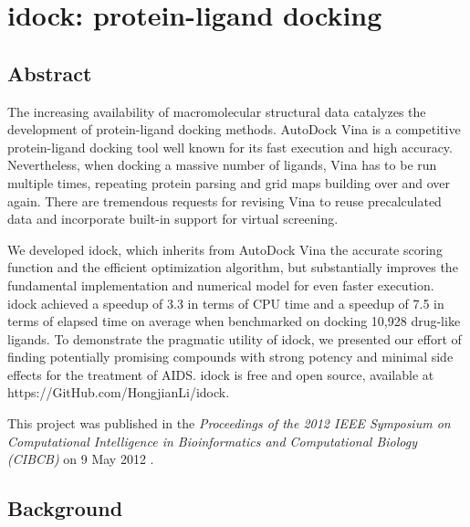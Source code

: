 \chapter{idock: protein-ligand docking}
\label{idock}

\section{Abstract}

The increasing availability of macromolecular structural data catalyzes the development of protein-ligand docking methods. AutoDock Vina is a competitive protein-ligand docking tool well known for its fast execution and high accuracy. Nevertheless, when docking a massive number of ligands, Vina has to be run multiple times, repeating protein parsing and grid maps building over and over again. There are tremendous requests for revising Vina to reuse precalculated data and incorporate built-in support for virtual screening.

We developed idock, which inherits from AutoDock Vina the accurate scoring function and the efficient optimization algorithm, but substantially improves the fundamental implementation and numerical model for even faster execution. idock achieved a speedup of 3.3 in terms of CPU time and a speedup of 7.5 in terms of elapsed time on average when benchmarked on docking 10,928 drug-like ligands. To demonstrate the pragmatic utility of idock, we presented our effort of finding potentially promising compounds with strong potency and minimal side effects for the treatment of AIDS. idock is free and open source, available at https://GitHub.com/HongjianLi/idock.

This project was published in the \textit{Proceedings of the 2012 IEEE Symposium on Computational Intelligence in Bioinformatics and Computational Biology (CIBCB)} on 9 May 2012 \citep{1153}.

\section{Background}

